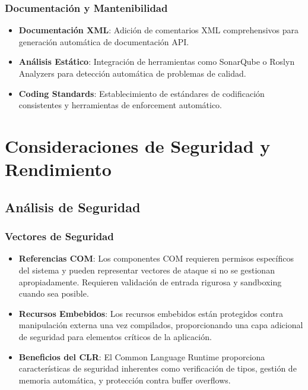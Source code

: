 \documentclass[a4paper]{article}
\begin{document}
\subsubsection{Documentación y Mantenibilidad}

\begin{itemize}
\item \textbf{Documentación XML}: Adición de comentarios XML comprehensivos para generación automática de documentación API.

\item \textbf{Análisis Estático}: Integración de herramientas como SonarQube o Roslyn Analyzers para detección automática de problemas de calidad.

\item \textbf{Coding Standards}: Establecimiento de estándares de codificación consistentes y herramientas de enforcement automático.
\end{itemize}

\section{Consideraciones de Seguridad y Rendimiento}

\subsection{Análisis de Seguridad}

\subsubsection{Vectores de Seguridad}

\begin{itemize}
\item \textbf{Referencias COM}: Los componentes COM requieren permisos específicos del sistema y pueden representar vectores de ataque si no se gestionan apropiadamente. Requieren validación de entrada rigurosa y sandboxing cuando sea posible.

\item \textbf{Recursos Embebidos}: Los recursos embebidos están protegidos contra manipulación externa una vez compilados, proporcionando una capa adicional de seguridad para elementos críticos de la aplicación.

\item \textbf{Beneficios del CLR}: El Common Language Runtime proporciona características de seguridad inherentes como verificación de tipos, gestión de memoria automática, y protección contra buffer overflows.
\end{itemize}
\end{document}
